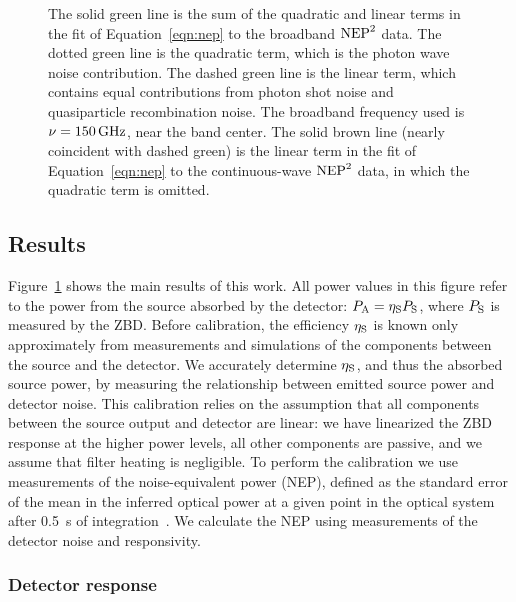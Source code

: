 \begin{figure}[p]
{The solid green line is the sum of the quadratic and linear terms in the fit of Equation~\ref{eqn:nep} to the broadband $\mathrm{NEP}^2$ data.
The dotted green line is the quadratic term, which is the photon wave noise contribution.
The dashed green line is the linear term, which contains equal contributions from photon shot noise and quasiparticle recombination noise.
The broadband frequency used is $\nu = \SI{150}{GHz}$, near the band center.
The solid brown line (nearly coincident with dashed green) is the linear term in the fit of Equation~\ref{eqn:nep} to the continuous-wave $\mathrm{NEP}^2$ data, in which the quadratic term is omitted.
}
\label{fig:measuring.results}
\end{figure}

\subsection{Results}

Figure~\ref{fig:measuring.results} shows the main results of this work.
All power values in this figure refer to the power from the source absorbed by the detector: $P_{\mathrm{A}} = \eta_{\mathrm{S}} P_{\mathrm{S}}$, where $P_{\mathrm{S}}$ is measured by the ZBD.
Before calibration, the efficiency $\eta_{\mathrm{S}}$ is known only approximately from measurements and simulations of the components between the source and the detector.
We accurately determine $\eta_{\mathrm{S}}$, and thus the absorbed source power, by measuring the relationship between emitted source power and detector noise.
This calibration relies on the assumption that all components between the source output and detector are linear: we have linearized the ZBD response at the higher power levels, all other components are passive, and we assume that filter heating is negligible.
To perform the calibration we use measurements of the noise-equivalent power (NEP), defined as the standard error of the mean in the inferred optical power at a given point in the optical system after \SI{0.5}{s} of integration~\autocite{Richards1994JAP,Zmuidzinas2003ApplOpt}.
We calculate the NEP using measurements of the detector noise and responsivity.

\subsubsection{Detector response}

